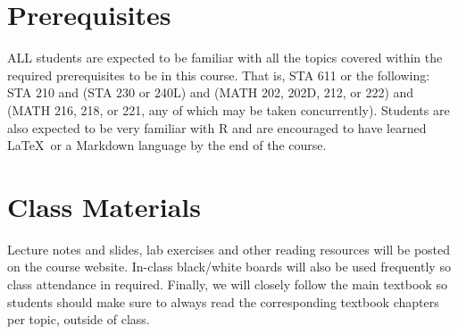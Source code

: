 \documentclass[11pt, a4paper]{article}
\begin{document}
\section{Prerequisites}
ALL students are expected to be familiar with all the topics covered within the required prerequisites to be in this course. That is, STA 611 or the following: STA 210 and (STA 230 or 240L) and (MATH 202, 202D, 212, or 222) and (MATH 216, 218, or 221, any of which may be taken concurrently). Students are also expected to be very familiar with \textsf{R} and are encouraged to have learned \LaTeX \ or a Markdown language by the end of the course.


\section{Class Materials}
Lecture notes and slides, lab exercises and other reading resources will be posted on the course website. In-class black/white boards will also be used frequently so class attendance in required. Finally, we will closely follow the main textbook so students should make sure to always read the corresponding textbook chapters per topic, outside of class.
\end{document}
